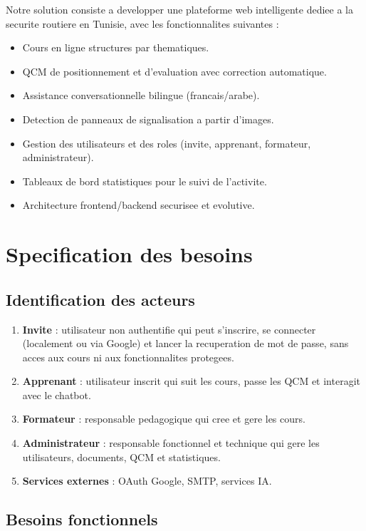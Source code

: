 \documentclass[a4paper,12pt]{report}
\begin{document}
Notre solution consiste a developper une plateforme web intelligente dediee
a la securite routiere en Tunisie, avec les fonctionnalites suivantes :

\begin{itemize}
  \item Cours en ligne structures par thematiques.
  \item QCM de positionnement et d'evaluation avec correction automatique.
  \item Assistance conversationnelle bilingue (francais/arabe).
  \item Detection de panneaux de signalisation a partir d'images.
  \item Gestion des utilisateurs et des roles (invite, apprenant, formateur, administrateur).
  \item Tableaux de bord statistiques pour le suivi de l'activite.
  \item Architecture frontend/backend securisee et evolutive.
\end{itemize}

\section{Specification des besoins}

\subsection{Identification des acteurs}

\begin{enumerate}
  \item \textbf{Invite} : utilisateur non authentifie qui peut s'inscrire,
        se connecter (localement ou via Google) et lancer la recuperation de
        mot de passe, sans acces aux cours ni aux fonctionnalites protegees.
  \item \textbf{Apprenant} : utilisateur inscrit qui suit les cours,
        passe les QCM et interagit avec le chatbot.
  \item \textbf{Formateur} : responsable pedagogique qui cree et gere
        les cours.
  \item \textbf{Administrateur} : responsable fonctionnel et technique
        qui gere les utilisateurs, documents, QCM et statistiques.
  \item \textbf{Services externes} : OAuth Google, SMTP, services IA.
\end{enumerate}

\subsection{Besoins fonctionnels}
\end{document}
